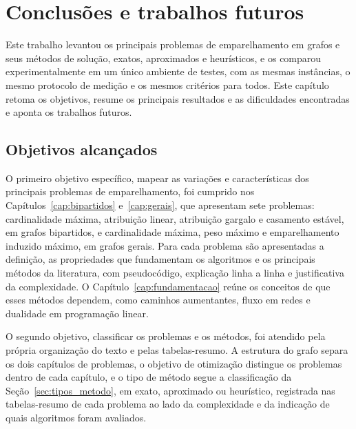 
\chapter{Conclusões e trabalhos futuros}
\label{cap:conclusoes}

Este trabalho levantou os principais problemas de emparelhamento em grafos e seus métodos de solução, exatos, aproximados e heurísticos, e os comparou experimentalmente em um único ambiente de testes, com as mesmas instâncias, o mesmo protocolo de medição e os mesmos critérios para todos. Este capítulo retoma os objetivos, resume os principais resultados e as dificuldades encontradas e aponta os trabalhos futuros.

\section{Objetivos alcançados}
\label{sec:objetivos_alcancados}

O primeiro objetivo específico, mapear as variações e características dos principais problemas de emparelhamento, foi cumprido nos Capítulos~\ref{cap:bipartidos} e~\ref{cap:gerais}, que apresentam sete problemas: cardinalidade máxima, atribuição linear, atribuição gargalo e casamento estável, em grafos bipartidos, e cardinalidade máxima, peso máximo e emparelhamento induzido máximo, em grafos gerais. Para cada problema são apresentadas a definição, as propriedades que fundamentam os algoritmos e os principais métodos da literatura, com pseudocódigo, explicação linha a linha e justificativa da complexidade. O Capítulo~\ref{cap:fundamentacao} reúne os conceitos de que esses métodos dependem, como caminhos aumentantes, fluxo em redes e dualidade em programação linear.

O segundo objetivo, classificar os problemas e os métodos, foi atendido pela própria organização do texto e pelas tabelas-resumo. A estrutura do grafo separa os dois capítulos de problemas, o objetivo de otimização distingue os problemas dentro de cada capítulo, e o tipo de método segue a classificação da Seção~\ref{sec:tipos_metodo}, em exato, aproximado ou heurístico, registrada nas tabelas-resumo de cada problema ao lado da complexidade e da indicação de quais algoritmos foram avaliados.

